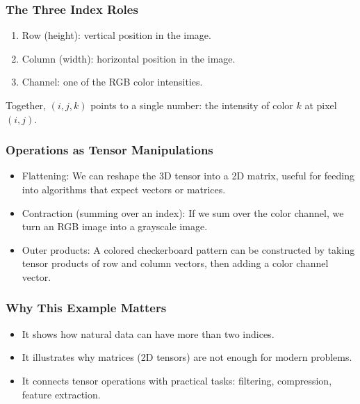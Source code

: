 \documentclass[
  letterpaper,
  DIV=11,
  numbers=noendperiod]{scrreprt}
\providecommand{\tightlist}{%
  \setlength{\itemsep}{0pt}\setlength{\parskip}{0pt}}
\begin{document}
\subsubsection{The Three Index Roles}\label{the-three-index-roles}

\begin{enumerate}
\def\labelenumi{\arabic{enumi}.}
\tightlist
\item
  Row (height): vertical position in the image.
\item
  Column (width): horizontal position in the image.
\item
  Channel: one of the RGB color intensities.
\end{enumerate}

Together, \((i,j,k)\) points to a single number: the intensity of color
\(k\) at pixel \((i,j)\).

\subsubsection{Operations as Tensor
Manipulations}\label{operations-as-tensor-manipulations}

\begin{itemize}
\tightlist
\item
  Flattening: We can reshape the 3D tensor into a 2D matrix, useful for
  feeding into algorithms that expect vectors or matrices.
\item
  Contraction (summing over an index): If we sum over the color channel,
  we turn an RGB image into a grayscale image.
\item
  Outer products: A colored checkerboard pattern can be constructed by
  taking tensor products of row and column vectors, then adding a color
  channel vector.
\end{itemize}

\subsubsection{Why This Example Matters}\label{why-this-example-matters}

\begin{itemize}
\tightlist
\item
  It shows how natural data can have more than two indices.
\item
  It illustrates why matrices (2D tensors) are not enough for modern
  problems.
\item
  It connects tensor operations with practical tasks: filtering,
  compression, feature extraction.
\end{itemize}
\end{document}
